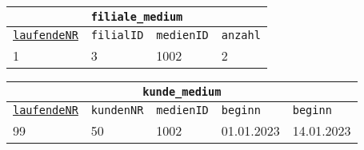 \begin{Answer}[ref=TabelleErstellen1]
\begin{enumerate}
        \medskip

		\begin{tabular}{llll}
			\multicolumn{4}{c}{\lstinline!filiale_medium!}\\
			\hline
			\underline{\lstinline!laufendeNR!}&\lstinline!filialID!&\lstinline!medienID!&\lstinline!anzahl!\\
			\hline
			1&3&1002&2\\
		\end{tabular}

        \medskip

		\begin{tabular}{lllll}
			\multicolumn{5}{c}{\lstinline!kunde_medium!}\\
			\hline
			\underline{\lstinline!laufendeNR!}&\lstinline!kundenNR!&\lstinline!medienID!&\lstinline!beginn!&\lstinline!beginn!\\
			\hline
			99&50&1002&01.01.2023&14.01.2023\\
		\end{tabular}
	\end{enumerate}
\end{Answer}